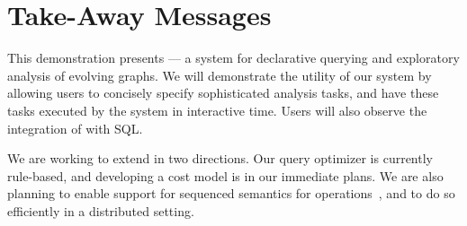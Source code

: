 \section{Take-Away Messages}
\label{sec:conc}

This demonstration presents \sys --- a system for declarative querying
and exploratory analysis of evolving graphs.  We will demonstrate the
utility of our system by allowing users to concisely specify
sophisticated analysis tasks, and have these tasks executed by the
\sys system in interactive time.  Users will also observe the
integration of \ql with SQL.

We are working to extend \sys in two directions.  Our query optimizer
is currently rule-based, and developing a cost model is in our
immediate plans.  We are also planning to enable support for sequenced
semantics for \tga operations~\cite{MoffittEDBT17}, and to do so
efficiently in a distributed setting.

